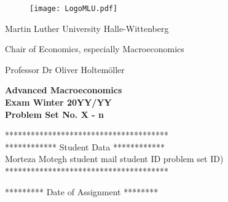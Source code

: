 \documentclass[12pt,a4paper,notitlepage]{article}
\numberwithin{equation}{section}
\begin{document}
	\thispagestyle{empty}

	
	\begin{figure} [H]
		\texttt{[image: LogoMLU.pdf]}
	\end{figure}
	Martin Luther University Halle-Wittenberg 
	
	Chair of Economics, especially Macroeconomics
	
	Professor Dr Oliver Holtemöller
	
	\vspace*{4.75cm}
	\begin{center}
		{\Huge\bf Advanced Macroeconomics}\\ \vspace*{.5cm}
		{\Large\bf Exam Winter 20YY/YY}\\ \vspace*{.5cm} 
		{\large\bf Problem Set No. X - n}\\ \vspace*{.5cm}		
	\end{center}
	
	
	\vspace*{4.75cm}
	
	************************************** \\
	
	************ Student Data ************ \\
	Morteza Motegh
	student mail
	student ID
	problem set ID) \\
	**************************************
	
	\vspace*{1cm}
	
	********* Date of Assignment ********
	
\newpage

\tableofcontents
\listoffigures 
\listoftables

\newpage
\thispagestyle{plain}
	
\end{document}
